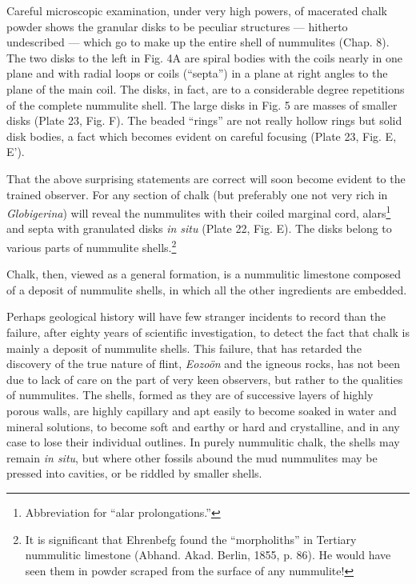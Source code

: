 \documentclass[a4paper, 12pt, oneside, landscape]{article}
\begin{document}
Careful microscopic examination, under very high powers, of macerated chalk powder shows the granular disks to be peculiar structures --- hitherto undescribed --- which go to make up the entire shell of nummulites (Chap. 8). The two disks to the left in Fig. 4A are spiral bodies with the coils nearly in one plane and with radial loops or coils (``septa'') in a plane at right angles to the plane of the main coil. The disks, in fact, are to a considerable degree repetitions of the complete nummulite shell. The large disks in Fig. 5 are masses of smaller disks (Plate 23, Fig. F). The beaded ``rings'' are not really hollow rings but solid disk bodies, a fact which becomes evident on careful focusing (Plate 23, Fig. E, E').

That the above surprising statements are correct will soon become evident to the trained observer. For any section of chalk (but preferably one not very rich in \emph{Globigerina}) will reveal the nummulites with their coiled marginal cord, alars\footnote{Abbreviation for ``alar prolongations.''} and septa with granulated disks \emph{in situ} (Plate 22, Fig. E). The disks belong to various parts of nummulite shells.\footnote{It is significant that Ehrenbefg found the ``morpholiths'' in Tertiary nummulitic limestone (Abhand. Akad. Berlin, 1855, p. 86). He would have seen them in powder scraped from the surface of any nummulite!}

Chalk, then, viewed as a general formation, is a nummulitic limestone composed of a deposit of nummulite shells, in which all the other ingredients are embedded.

Perhaps geological history will have few stranger incidents to record than the failure, after eighty years of scientific investigation, to detect the fact that chalk is mainly a deposit of nummulite shells. This failure, that has retarded the discovery of the true nature of flint, \emph{Eozoön} and the igneous rocks, has not been due to lack of care on the part of very keen observers, but rather to the qualities of nummulites. The shells, formed as they are of successive layers of highly porous walls, are highly capillary and apt easily to become soaked in water and mineral solutions, to become soft and earthy or hard and crystalline, and in any case to lose their individual outlines. In purely nummulitic chalk, the shells may remain \emph{in situ}, but where other fossils abound the mud nummulites may be pressed into cavities, or be riddled by smaller shells.
\end{document}
